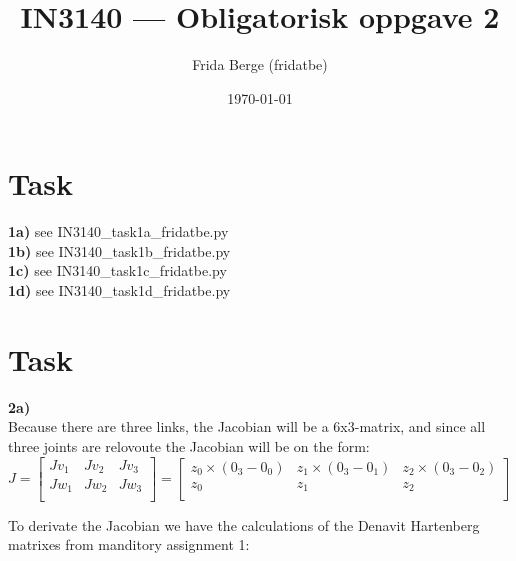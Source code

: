 \documentclass[12pt,norsk,a4paper]{article}
\author{Frida Berge (fridatbe)}
\title{IN3140 --- Obligatorisk oppgave 2}
\date{\today}
\begin{document}
    \maketitle
    \renewcommand{\thesubsection}{(\alph{subsection})}
    \newpage
    \section{Task}
    \textbf{1a)} see IN3140\_task1a\_fridatbe.py\\
    \textbf{1b)} see IN3140\_task1b\_fridatbe.py\\
    \textbf{1c)} see IN3140\_task1c\_fridatbe.py\\
    \textbf{1d)} see IN3140\_task1d\_fridatbe.py\\
    \newpage

    \section{Task}
    \textbf{2a)}\\
    Because there are three links, the Jacobian will be a 6x3-matrix, and since all three joints are relovoute the Jacobian will be on the form:
    \[J = \left[ \begin{array}{ccc}
        Jv_1 & Jv_2 & Jv_3\\
        Jw_1 & Jw_2 & Jw_3\\
    \end{array} \right]
    = \left[ \begin{array}{ccc}
        z_0\times(0_3-0_0) & z_1\times(0_3-0_1) & z_2\times(0_3-0_2)\\
        z_0 & z_1 & z_2\\
    \end{array} \right]\]


    To derivate the Jacobian we have the calculations of the Denavit Hartenberg matrixes from manditory assignment 1:
   
\end{document}
